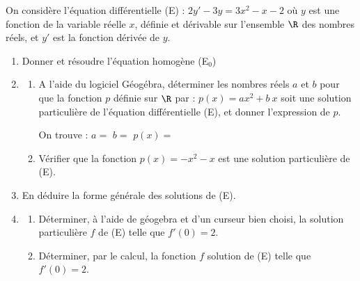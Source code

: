 On considère l’équation différentielle (E) : $2y' - 3y = 3x^2-x-2$ où $y$ est une fonction de la variable réelle $x$, définie et dérivable sur l’ensemble $\R$ des nombres réels, et $y'$ est la fonction dérivée de $y$.

\begin{enumerate}
	\item Donner et résoudre l'équation homogène (E$_0$)\sautp

    \item \begin{enumerate}
	\item A l’aide du logiciel Géogébra, déterminer les nombres réels $a$ et $b$ pour que la fonction $p$ définie sur $\R$ par : $p(x) = ax^2 + b~x$ soit une solution particulière de l'équation différentielle (E), et donner l’expression de $p$. \sautm
		
		
		On trouve : $a=$\makebox[0.1\linewidth]{\dotfill} \hfill $b=$\makebox[0.1\linewidth]{\dotfill} \hfill $p(x)=$\makebox[0.3\linewidth]{\dotfill}\sauts
	\end{enumerate}
	\appelprof
    \begin{enumerate}
    \setcounter{enumii}{1}
	\item Vérifier que la fonction $p(x)=-x^2-x$ est une solution particulière de (E).\sautm

    \end{enumerate}
	\item En déduire la forme générale des solutions de (E).\sautp

    \item \begin{enumerate}
	\item Déterminer, à l'aide de géogebra et d'un curseur bien choisi, la solution particulière $f$ de (E) telle que $f'(0)=2$.\sautp

    \end{enumerate}
    \appelprof
    \begin{enumerate}
    \setcounter{enumii}{1}
	\item Déterminer, par le calcul, la fonction $f$ solution de (E) telle que $f'(0)=2$.\sautp

    \end{enumerate}
	
\end{enumerate}